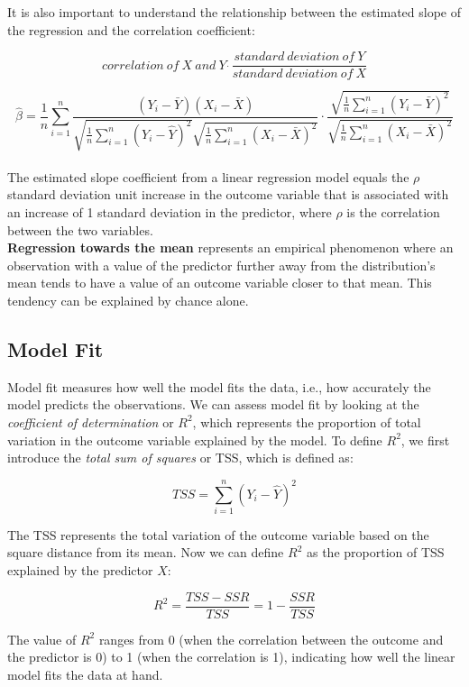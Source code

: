 \documentclass{article}
\begin{document}
    It is also important to understand the relationship between the
    estimated slope of the regression and the correlation coefficient:

    \[
        correlation \ of \ X \ and \ Y \ \dot \ \frac{standard \ deviation \ of \ Y}{standard \ deviation \ of \ X}
    \]

    \[
        \hat{\beta} = \frac{1}{n}\sum^{n}_{i=1}\frac{(Y_i - \bar{Y})(X_i - \bar{X})}{\sqrt{\frac{1}{n}\sum^{n}_{i=1}(Y_i-\hat{Y})^2}\sqrt{\frac{1}{n}\sum^{n}_{i=1}(X_i-\bar{X})^2}} \cdot \frac{\sqrt{\frac{1}{n}\sum^{n}_{i=1}(Y_i - \bar{Y})^2}}{\sqrt{\frac{1}{n}\sum^{n}_{i=1}(X_i-\bar{X})^2}}
    \]\\

    \noindent The estimated slope coefficient from a linear regression model
equals the $\rho$ standard deviation unit increase in the outcome variable
that is associated with an increase of 1 standard deviation in the
predictor, where $\rho$ is the correlation between the two variables.\\

    \noindent \textbf{Regression towards the mean} represents an empirical
phenomenon where an observation with a value of the predictor further away
from the distribution's mean tends to have a value of an outcome variable
closer to that mean. This tendency can be explained by chance alone.

    \subsection{Model Fit}

    \noindent Model fit measures how well the model fits the data, i.e., how
accurately the model predicts the observations. We can assess model fit by
looking at the \textit{coefficient of determination} or $R^2$, which
represents the proportion of total variation in the outcome variable
explained by the model. To define $R^2$, we first introduce the
\textit{total sum of squares} or TSS, which is defined as:

    \[
        TSS = \sum^{n}_{i=1}(Y_i - \hat{Y})^2
    \]

    The TSS represents the total variation of the outcome variable based on
    the square distance from its mean. Now we can define $R^2$ as the
proportion of TSS explained by the predictor $X$:

    \[
        R^2 = \frac{TSS - SSR}{TSS} = 1 - \frac{SSR}{TSS}
    \]

    The value of $R^2$ ranges from 0 (when the correlation between the
outcome and the predictor is 0) to 1 (when the correlation is 1), indicating
how well the linear model fits the data at hand.
\end{document}

